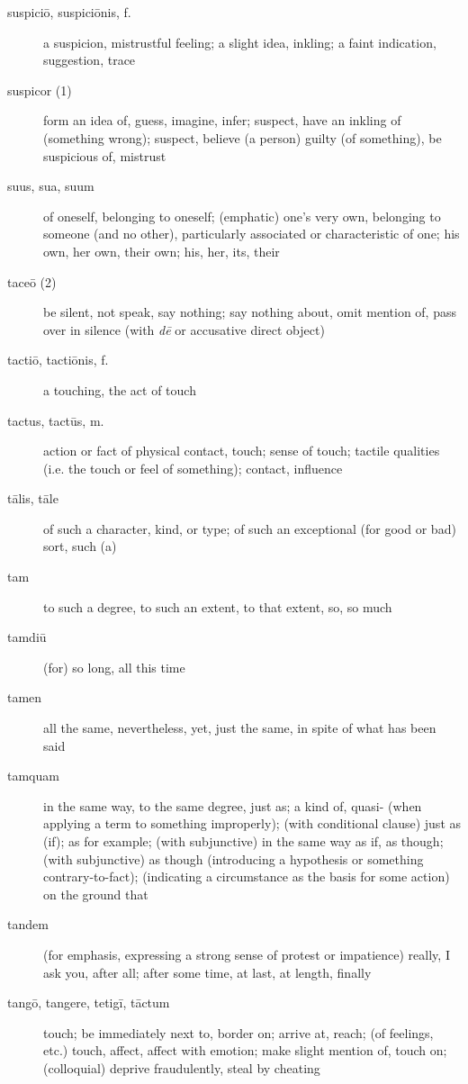 \begin{description}
    \item[suspiciō, suspiciōnis, f.] a suspicion, mistrustful feeling; a slight idea, inkling; a faint indication, suggestion, trace
    \item[suspicor (1)] form an idea of, guess, imagine, infer; suspect, have an inkling of (something wrong); suspect, believe (a person) guilty (of something), be suspicious of, mistrust
    \item[suus, sua, suum] \marginnote{*}of oneself, belonging to oneself; (emphatic) one's very own, belonging to someone (and no other), particularly associated or characteristic of one; his own, her own, their own; his, her, its, their
    \item[taceō (2)] \marginnote{*}be silent, not speak, say nothing; say nothing about, omit mention of, pass over in silence (with \textit{dē} or accusative direct object)
    \item[tactiō, tactiōnis, f.] a touching, the act of touch
    \item[tactus, tactūs, m.] action or fact of physical contact, touch; sense of touch; tactile qualities (i.e. the touch or feel of something); contact, influence
    \item[tālis, tāle] \marginnote{*}of such a character, kind, or type; of such an exceptional (for good or bad) sort, such (a)
    \item[tam] \marginnote{*}to such a degree, to such an extent, to that extent, so, so much
    \item[tamdiū] (for) so long, all this time
    \item[tamen] \marginnote{*}all the same, nevertheless, yet, just the same, in spite of what has been said
    \item[tamquam] \marginnote{*}in the same way, to the same degree, just as; a kind of, quasi- (when applying a term to something improperly); (with conditional clause) just as (if); as for example; (with subjunctive) in the same way as if, as though; (with subjunctive) as though (introducing a hypothesis or something contrary-to-fact); (indicating a circumstance as the basis for some action) on the ground that
    \item[tandem] \marginnote{*}(for emphasis, expressing a strong sense of protest or impatience) really, I ask you, after all; after some time, at last, at length, finally
    \item[tangō, tangere, tetigī, tāctum] \marginnote{*}touch; be immediately next to, border on; arrive at, reach; (of feelings, etc.) touch, affect, affect with emotion; make slight mention of, touch on; (colloquial) deprive fraudulently, steal by cheating

\end{description}
